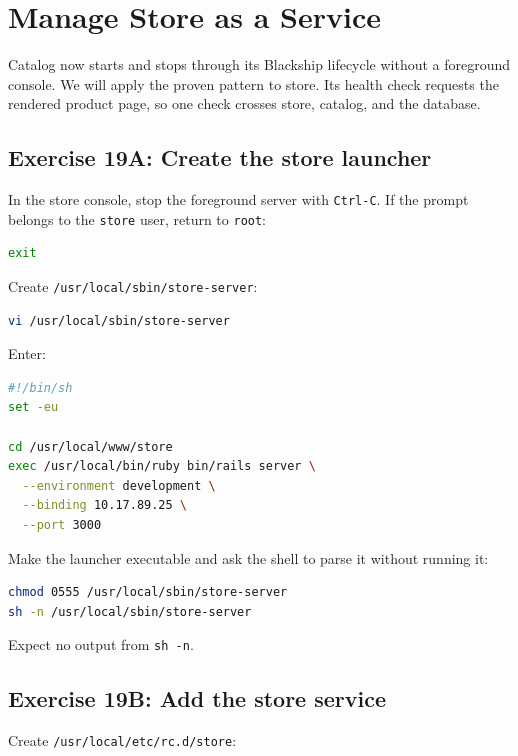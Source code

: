 \chapter{Manage Store as a Service}

Catalog now starts and stops through its Blackship lifecycle without a
foreground console. We will apply the proven pattern to store. Its health check
requests the rendered product page, so one check crosses store, catalog, and
the database.

\section{Exercise 19A: Create the store launcher}

In the store console, stop the foreground server with \texttt{Ctrl-C}. If the
prompt belongs to the \texttt{store} user, return to \texttt{root}:

\begin{lstlisting}[language=sh]
exit
\end{lstlisting}

Create \texttt{/usr/local/sbin/store-server}:

\begin{lstlisting}[language=sh]
vi /usr/local/sbin/store-server
\end{lstlisting}

Enter:

\begin{lstlisting}[language=sh]
#!/bin/sh
set -eu

cd /usr/local/www/store
exec /usr/local/bin/ruby bin/rails server \
  --environment development \
  --binding 10.17.89.25 \
  --port 3000
\end{lstlisting}

Make the launcher executable and ask the shell to parse it without running it:

\begin{lstlisting}[language=sh]
chmod 0555 /usr/local/sbin/store-server
sh -n /usr/local/sbin/store-server
\end{lstlisting}

Expect no output from \texttt{sh -n}.

\section{Exercise 19B: Add the store service}

Create \texttt{/usr/local/etc/rc.d/store}:

